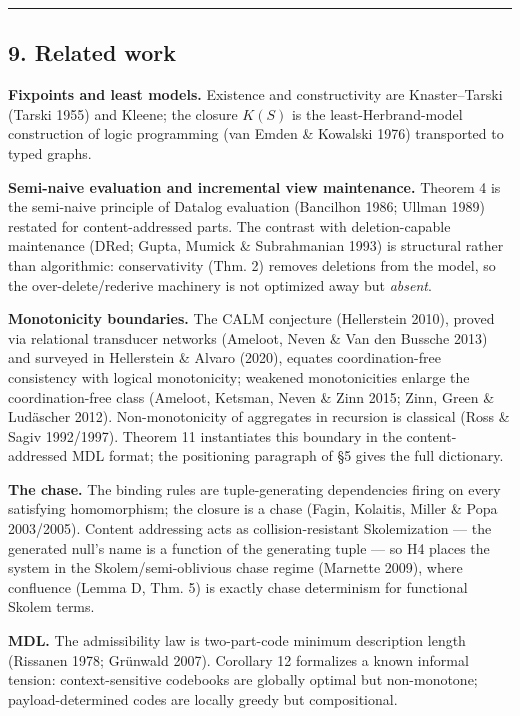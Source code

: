 \documentclass[
  10pt,
]{article}
\begin{document}
\begin{center}\rule{0.5\linewidth}{0.5pt}\end{center}

\hypertarget{related-work}{%
\subsection{9. Related work}\label{related-work}}

\textbf{Fixpoints and least models.} Existence and constructivity are
Knaster--Tarski (Tarski 1955) and Kleene; the closure \(K(S)\) is the
least-Herbrand-model construction of logic programming (van Emden \&
Kowalski 1976) transported to typed graphs.

\textbf{Semi-naive evaluation and incremental view maintenance.} Theorem
4 is the semi-naive principle of Datalog evaluation (Bancilhon 1986;
Ullman 1989) restated for content-addressed parts. The contrast with
deletion-capable maintenance (DRed; Gupta, Mumick \& Subrahmanian 1993)
is structural rather than algorithmic: conservativity (Thm. 2) removes
deletions from the model, so the over-delete/rederive machinery is not
optimized away but \emph{absent}.

\textbf{Monotonicity boundaries.} The CALM conjecture (Hellerstein
2010), proved via relational transducer networks (Ameloot, Neven \& Van
den Bussche 2013) and surveyed in Hellerstein \& Alvaro (2020), equates
coordination-free consistency with logical monotonicity; weakened
monotonicities enlarge the coordination-free class (Ameloot, Ketsman,
Neven \& Zinn 2015; Zinn, Green \& Ludäscher 2012). Non-monotonicity of
aggregates in recursion is classical (Ross \& Sagiv 1992/1997). Theorem
11 instantiates this boundary in the content-addressed MDL format; the
positioning paragraph of §5 gives the full dictionary.

\textbf{The chase.} The binding rules are tuple-generating dependencies
firing on every satisfying homomorphism; the closure is a chase (Fagin,
Kolaitis, Miller \& Popa 2003/2005). Content addressing acts as
collision-resistant Skolemization --- the generated null's name is a
function of the generating tuple --- so H4 places the system in the
Skolem/semi-oblivious chase regime (Marnette 2009), where confluence
(Lemma D, Thm. 5) is exactly chase determinism for functional Skolem
terms.

\textbf{MDL.} The admissibility law is two-part-code minimum description
length (Rissanen 1978; Grünwald 2007). Corollary 12 formalizes a known
informal tension: context-sensitive codebooks are globally optimal but
non-monotone; payload-determined codes are locally greedy but
compositional.
\end{document}
